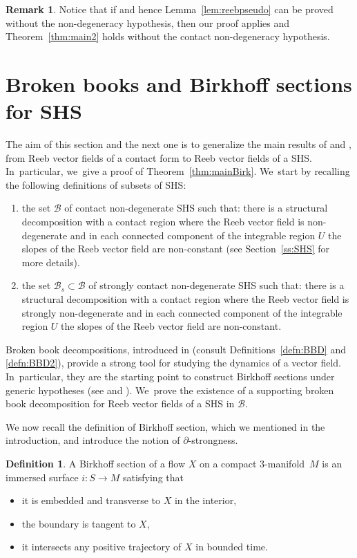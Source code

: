 \documentclass[JEP,XML,SOM,Unicode,NoEqCountersInSection,NoFloatCountersInSection,published]{cedram}
\newcommand{\threemanifold}{$3$\nobreakdash-mani\-fold\xspace}
\theoremstyle{definition}
\newtheorem{defi}[theorem]{Definition}
\newtheorem{Remark}[theorem]{Remark}
\begin{document}
\begin{Remark}\label{rem:degeneratecase}
Notice that if \cite[Th.\,1.2]{CDR} and hence Lemma~\ref{lem:reebpseudo} can be proved without the non-degeneracy hypothesis, then our proof applies and Theorem~\ref{thm:main2} holds without the contact non-degeneracy hypothesis.
\end{Remark}

\section{Broken books and Birkhoff sections for SHS}\label{s:SHSsections}

The aim of this section and the next one is to generalize the main results of \cite{CDR} and \cite{CDHR, CM}, from Reeb vector fields of a contact form to Reeb vector fields of a SHS. In~particular, we~give a proof of Theorem~\ref{thm:mainBirk}. We~start by recalling the following definitions of subsets of SHS:
\begin{enumerate}
\item the set $\mathcal{B}$ of contact non-degenerate SHS such that: there is a structural decomposition with a contact region where the Reeb vector field is non-degenerate and in each connected component of the integrable region $U$ the slopes of the Reeb vector field are non-constant (see Section~\ref{ss:SHS} for more details).
\item the set $\mathcal{B}_s\subset \mathcal{B}$ of strongly contact non-degenerate SHS such that: there is a structural decomposition with a contact region where the Reeb vector field is strongly non-degenerate and in each connected component of the integrable region $U$ the slopes of the Reeb vector field are non-constant.
\end{enumerate}

Broken book decompositions, introduced in \cite{CDR} (consult Definitions~\ref{defn:BBD} and \ref{defn:BBD2}), provide a strong tool for studying the dynamics of a vector field. In~particular, they are the starting point to construct Birkhoff sections under generic hypotheses (see \cite{CDHR} and \cite{CM}). We~prove the existence of a supporting broken book decomposition for Reeb vector fields of a SHS in $\mathcal{B}$.

We now recall the definition of Birkhoff section, which we mentioned in the introduction, and introduce the notion of $\partial$-strongness.

\begin{defi}
A Birkhoff section of a flow $X$ on a compact \threemanifold~$M$ is an immersed surface $i:S \to M$ satisfying that
\begin{itemize}
\item
it is embedded and transverse to $X$ in the interior,
\item
the boundary is tangent to $X$,
\item
it intersects any positive trajectory of $X$ in bounded time.
\end{itemize}
\end{defi}
\end{document}
